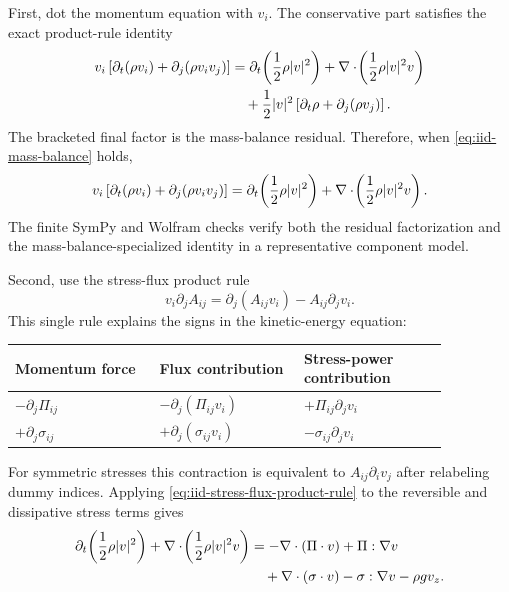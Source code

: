 First, dot the momentum equation with \(v_i\).  The conservative part satisfies
the exact product-rule identity
\begin{align}
  v_i\left[
    \partial_t(\rho v_i)+\partial_j(\rho v_i v_j)
  \right]
  &=
  \partial_t\!\left(\frac{1}{2}\rho |v|^2\right)
  +
  \nabla\cdot\!\left(\frac{1}{2}\rho |v|^2 v\right)
  \\
  &\quad+
  \frac12 |v|^2\left[
    \partial_t\rho+\partial_j(\rho v_j)
  \right].
  \label{eq:iid-kinetic-left-with-residual}
\end{align}
The bracketed final factor is the mass-balance residual.  Therefore, when
\eqref{eq:iid-mass-balance} holds,
\begin{equation}
  v_i\left[
    \partial_t(\rho v_i)+\partial_j(\rho v_i v_j)
  \right]
  =
  \partial_t\!\left(\frac{1}{2}\rho |v|^2\right)
  +
  \nabla\cdot\!\left(\frac{1}{2}\rho |v|^2 v\right).
  \label{eq:iid-kinetic-left}
\end{equation}
The finite SymPy and Wolfram checks verify both the residual factorization and
the mass-balance-specialized identity in a representative component model.

Second, use the stress-flux product rule
\begin{equation}
  v_i\partial_j A_{ij}
  =
  \partial_j(A_{ij}v_i)-A_{ij}\partial_j v_i .
  \label{eq:iid-stress-flux-product-rule}
\end{equation}
This single rule explains the signs in the kinetic-energy equation:
\begin{center}
\begin{tabular}{@{}p{0.28\linewidth}p{0.29\linewidth}p{0.29\linewidth}@{}}
\toprule
Momentum force & Flux contribution & Stress-power contribution \\
\midrule
\(-\partial_j\Pi_{ij}\) & \(-\partial_j(\Pi_{ij}v_i)\) & \(+\Pi_{ij}\partial_j v_i\) \\
\(+\partial_j\sigma_{ij}\) & \(+\partial_j(\sigma_{ij}v_i)\) & \(-\sigma_{ij}\partial_j v_i\) \\
\bottomrule
\end{tabular}
\end{center}
For symmetric stresses this contraction is equivalent to
\(A_{ij}\partial_i v_j\) after relabeling dummy indices.  Applying
\eqref{eq:iid-stress-flux-product-rule} to the reversible and dissipative
stress terms gives
\begin{align}
  \partial_t\!\left(\frac{1}{2}\rho |v|^2\right)
  +\nabla\cdot\!\left(\frac{1}{2}\rho |v|^2v\right)
  &=
  -\nabla\cdot(\Pi\cdot v)+\Pi:\nabla v
  \nonumber\\
  &\quad
  +\nabla\cdot(\sigma\cdot v)-\sigma:\nabla v
  -\rho g v_z .
  \label{eq:iid-kinetic-balance}
\end{align}

